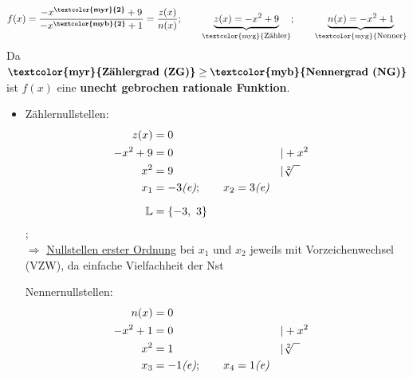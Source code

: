 \begin{solution}{}
    \begin{equation*}
        f(x) = \dfrac{-x^{\textbf{\textcolor{myr}{2}}} + 9}{-x^{\textbf{\textcolor{myb}{2}}} + 1} = \dfrac{z(x)}{n(x)}; \qquad \underbrace{z(x) = -x^2 + 9}_{\text{\textcolor{myg}{\text{\footnotesize{Zähler}}}}}; \qquad \underbrace{n(x) = -x^2 + 1}_{\text{\textcolor{myg}{\text{\footnotesize{Nenner}}}}}
    \end{equation*}
    Da $\text{\textbf{\textcolor{myr}{Zählergrad (ZG)}}} \geq \text{\textbf{\textcolor{myb}{Nennergrad (NG)}}}$ ist $f(x)$ eine \textbf{unecht gebrochen rationale Funktion}.
    \begin{itemize}[leftmargin=*]
        \item \begin{minipage}[t]{0.45\linewidth}
                Zählernullstellen:
                \begin{align*}
                    z(x) &= 0 \\
                    -x^2 + 9 &= 0 &&| + x^2\\
                    x^2 &= 9 &&| \sqrt[2]{\phantom{x}}\\
                    x_1 &= - 3 \text{\textit{(e)}} ; \qquad x_2 = 3 \text{\textit{(e)}} &&\\[1.5ex]
                    \mathbb{L} &= \left\{ -3,\ 3 \right\}&&\\
                \end{align*}
                ; \quad {}\\[2ex]
                $\Rightarrow$ \href{https://www.mathe-online.at/mathint/fun2/i_Nullstellen.html}{Nullstellen erster Ordnung} bei $x_1$ und $x_2$ jeweils mit Vorzeichenwechsel (VZW), da einfache Vielfachheit der Nst\\[1ex]
            \end{minipage}
            \hfill
            \begin{minipage}[t]{0.45\linewidth}
                Nennernullstellen:
                \begin{align*}
                    n(x) &= 0 \\
                    -x^2 + 1 &= 0 &&| + x^2\\
                    x^2 &= 1 &&| \sqrt[2]{\phantom{x}}\\
                    x_3 &= - 1 \text{\textit{(e)}} ; \qquad x_4 = 1 \text{\textit{(e)}} &&\\[1.5ex]

\end{align*}
\end{minipage}
\end{itemize}
\end{solution}
